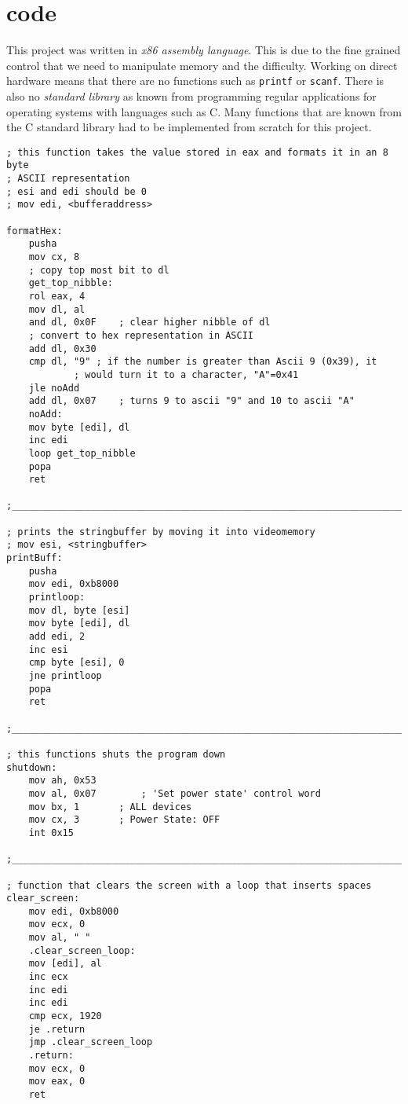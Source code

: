\section{code}

This project was written in \textit{x86 assembly language}. This is
due to the fine grained control that we need to manipulate memory and
the difficulty. Working on direct hardware means that there are no functions such as \texttt{printf} or \texttt{scanf}. There is also no
\textit{standard library} as known from programming regular applications for operating systems with languages such as C. Many
functions that are known from the C standard library had to be implemented from scratch for this project. 

\begin{lstlisting}[language={[x86masm]Assembler}]
; this function takes the value stored in eax and formats it in an 8 byte
; ASCII representation
; esi and edi should be 0
; mov edi, <bufferaddress>

formatHex:
	pusha
	mov cx, 8
	; copy top most bit to dl
	get_top_nibble:
	rol eax, 4
	mov dl, al
	and dl, 0x0F	; clear higher nibble of dl
	; convert to hex representation in ASCII
	add dl, 0x30
	cmp dl, "9"	; if the number is greater than Ascii 9 (0x39), it
			; would turn it to a character, "A"=0x41 
	jle noAdd
	add dl, 0x07 	; turns 9 to ascii "9" and 10 to ascii "A"
	noAdd:
	mov byte [edi], dl
	inc edi
	loop get_top_nibble
	popa
	ret

;_________________________________________________________________________

; prints the stringbuffer by moving it into videomemory
; mov esi, <stringbuffer>
printBuff:
	pusha
	mov edi, 0xb8000
	printloop:
	mov dl, byte [esi]
	mov byte [edi], dl
	add edi, 2
	inc esi
	cmp byte [esi], 0
	jne printloop
	popa
	ret

;_________________________________________________________________________

; this functions shuts the program down
shutdown:	
	mov ah, 0x53
	mov al, 0x07		; 'Set power state' control word
	mov bx, 1 		; ALL devices
	mov cx, 3 		; Power State: OFF
	int 0x15

;_________________________________________________________________________

; function that clears the screen with a loop that inserts spaces
clear_screen:
	mov edi, 0xb8000
	mov ecx, 0
	mov al, " "
	.clear_screen_loop:
	mov [edi], al
	inc ecx
	inc edi
	inc edi
	cmp ecx, 1920
	je .return
	jmp .clear_screen_loop
	.return:
	mov ecx, 0
	mov eax, 0
	ret


\end{lstlisting}
